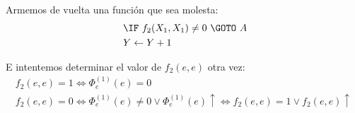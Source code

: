 \documentclass[fleqn, 11pt]{article}
\newcommand{\indef}{\uparrow}
\newcommand{\into}{\leftarrow}
\begin{document}
Armemos de vuelta una función que sea molesta:
\begin{align*}
	[A]\ &\IF\ f_2(X_1, X_1) \neq 0\ \GOTO\ A \\
	     &Y \into Y + 1
\end{align*}

E intentemos determinar el valor de $f_2(e, e)$ otra vez:
\begin{gather*}
	f_2(e, e) = 1 \iff \Phi^{(1)}_e(e) = 0 \\
	f_2(e, e) = 0
	\iff \Phi^{(1)}_e(e) \neq 0 \lor \Phi^{(1)}_e(e) \indef
	\iff f_2(e, e) = 1 \lor f_2(e, e) \indef
\end{gather*}
\end{document}
